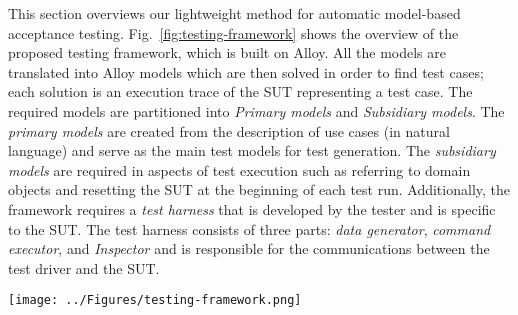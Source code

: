 %
%
\label{sec:framework-overview}
This section overviews our lightweight method for automatic model-based acceptance testing. 
Fig.~\ref{fig:testing-framework} shows the overview of the proposed testing framework, which is built on Alloy. All the models are translated into Alloy models which are then solved in order to find test cases; each solution is an execution trace of the SUT representing a test case. The required models are partitioned into \textit{Primary models} and \textit{Subsidiary models}. The \textit{primary models} are created from the description of use cases (in natural language) and serve as the main test models for test generation. The \textit{subsidiary models} are required in aspects of test execution such as referring to domain objects and resetting the SUT at the beginning of each test run. Additionally, the framework requires a \textit{test harness} that is developed by the tester and is specific to the SUT. The test harness consists of three parts: \textit{data generator}, \textit{command executor}, and \textit{Inspector} and is responsible for the communications between the test driver and the SUT.

\begin{figure*}[ht]
\centering
\texttt{[image: ../Figures/testing-framework.png]}
\caption{The architecture of the proposed testing framework.}
\label{fig:testing-framework}
\end{figure*}


